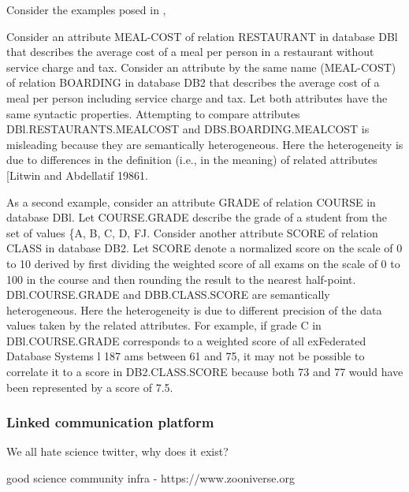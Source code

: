 \documentclass{article}
\begin{document}
Consider the examples posed in \cite{shethFederatedDatabaseSystems1990},\begin{leftbar}Consider an attribute MEAL-COST of relation RESTAURANT in database DBl
that describes the average cost of a meal per person in a restaurant
without service charge and tax. Consider an attribute by the same name
(MEAL-COST) of relation BOARDING in database DB2 that describes the
average cost of a meal per person including service charge and tax. Let
both attributes have the same syntactic properties. Attempting to
compare attributes DBl.RESTAURANTS.MEALCOST and DBS.BOARDING.MEALCOST is
misleading because they are semantically heterogeneous. Here the
heterogeneity is due to differences in the definition (i.e., in the
meaning) of related attributes {[}Litwin and Abdellatif 19861.

As a second example, consider an attribute GRADE of relation COURSE in
database DBl. Let COURSE.GRADE describe the grade of a student from the
set of values \{A, B, C, D, FJ. Consider another attribute SCORE of
relation CLASS in database DB2. Let SCORE denote a normalized score on
the scale of 0 to 10 derived by first dividing the weighted score of all
exams on the scale of 0 to 100 in the course and then rounding the
result to the nearest half-point. DBl.COURSE.GRADE and DBB.CLASS.SCORE
are semantically heterogeneous. Here the heterogeneity is due to
different precision of the data values taken by the related attributes.
For example, if grade C in DBl.COURSE.GRADE corresponds to a weighted
score of all exFederated Database Systems l 187 ams between 61 and 75,
it may not be possible to correlate it to a score in DB2.CLASS.SCORE
because both 73 and 77 would have been represented by a score of 7.5.
\end{leftbar}

\hypertarget{linked-communication-platform}{%
\subsubsection{Linked communication
platform}\label{linked-communication-platform}}

We all hate science twitter, why does it exist?

good science community infra - https://www.zooniverse.org
\end{document}
